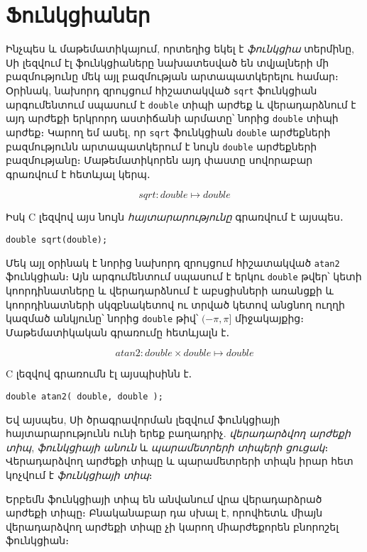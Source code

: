 \chapter{Ֆունկցիաներ}


Ինչպես և մաթեմատիկայում, որտեղից եկել է \emph{ֆունկցիա} տերմինը, Սի լեզվում
էլ ֆունկցիաները նախատեսված են տվյալների մի բազմությունը մեկ այլ բազմության
արտապատկերելու համար։ Օրինակ, նախորդ զրույցում հիշատակված \texttt{sqrt}
ֆունկցիան արգումենտում սպասում է \texttt{double} տիպի արժեք և վերադարձնում է
այդ արժեքի երկրորդ աստիճանի արմատը՝ նորից \texttt{double} տիպի արժեք։ Կարող
եմ ասել, որ \texttt{sqrt} ֆունկցիան \texttt{double} արժեքների բազմությունն
արտապատկերում է նույն \texttt{double} արժեքների բազմությանը։ Մաթեմատիկորեն
այդ փաստը սովորաբար գրառվում է հետևյալ կերպ․

\[
sqrt : double \mapsto double
\]

Իսկ C լեզվով այս նույն \emph{հայտարարությունը} գրառվում է այսպես․

\begin{Verbatim}
double sqrt(double);
\end{Verbatim}

Մեկ այլ օրինակ է նորից նախորդ զրույցում հիշատակված \texttt{atan2} ֆունկցիան։
Այն արգումենտում սպասում է երկու \texttt{double} թվեր՝ կետի կոորդինատները և
վերադարձնում է աբսցիսների առանցքի և կոորդինատների սկզբնակետով ու տրված կետով
անցնող ուղղի կազմած անկյունը՝ նորից \texttt{double} թիվ՝ \((−\pi, \pi]\)
միջակայքից։ Մաթեմատիկական գրառումը հետևյալն է․

\[
atan2 : double \times double \mapsto double
\]

C լեզվով գրառումն էլ այսպիսինն է․

\begin{Verbatim}
double atan2( double, double );
\end{Verbatim}

Եվ այսպես, Սի ծրագրավորման լեզվում ֆունկցիայի հայտարարությունն ունի երեք
բաղադրիչ. \emph{վերադարձվող արժեքի տիպ}, \emph{ֆունկցիայի անուն} և
\emph{պարամետրերի տիպերի ցուցակ}։ Վերադարձվող արժեքի տիպը և պարամետրերի տիպն
իրար հետ կոչվում է \emph{ֆունկցիայի տիպ}։

Երբեմն ֆունկցիայի տիպ են անվանում վրա վերադարձրած արժեքի տիպը։ Բնականաբար
դա սխալ է, որովհետև միայն վերադարձվող արժեքի տիպը չի կարող միարժեքորեն
բնորոշել ֆունկցիան։


